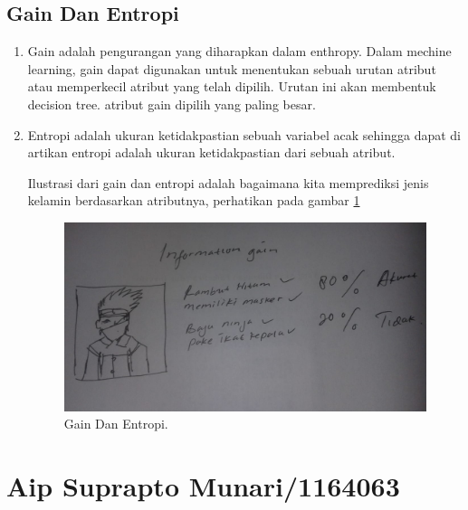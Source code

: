\subsection{Gain Dan Entropi}
\begin{enumerate}
\item Gain adalah pengurangan yang diharapkan dalam enthropy. Dalam mechine learning, gain dapat digunakan untuk menentukan sebuah urutan atribut atau memperkecil atribut yang telah dipilih. Urutan ini akan membentuk decision tree. atribut gain dipilih yang paling besar.

\item Entropi adalah ukuran ketidakpastian sebuah variabel acak sehingga dapat di artikan entropi adalah ukuran ketidakpastian dari sebuah atribut.

\subitem Ilustrasi dari gain dan entropi adalah bagaimana kita memprediksi jenis kelamin berdasarkan atributnya, perhatikan pada gambar \ref{7}

		\begin{figure}[ht]
		\centerline{\includegraphics[width=1\textwidth]{figures/AIP/7.JPEG}}
		\caption{Gain Dan Entropi.}
		\label{7}
		\end{figure}
\end{enumerate}

\section{Aip Suprapto Munari/1164063}
